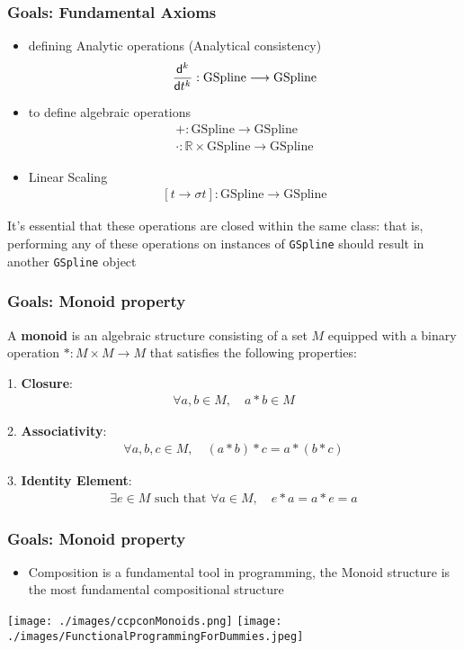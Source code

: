 \begin{frame}[t]
	\frametitle{Goals: Fundamental Axioms}
	{\fontsize{9}{5}
		\begin{itemize}
			\item defining Analytic operations (Analytical consistency)
			      \begin{equation*}
				      \frac{\mathsf{d}^{k} }{\mathsf{d} t^{k}}:\text{GSpline}\longrightarrow \text{GSpline}
			      \end{equation*}
			\item to define algebraic operations
			      \begin{eqnarray*}
				      +:\text{GSpline}\longrightarrow \text{GSpline}\\
				      \cdot:\mathbb{R} \times \text{GSpline}\longrightarrow \text{GSpline}
			      \end{eqnarray*}
			\item Linear Scaling
			      \begin{eqnarray*}
				      \left[t \rightarrow \sigma t \right]:\text{GSpline}\longrightarrow \text{GSpline}
			      \end{eqnarray*}
		\end{itemize}
		It's essential that these operations are closed within the same class: that is, performing any of these operations on instances of \Verb|GSpline| should result in another \Verb|GSpline| object
	}
\end{frame}
\begin{frame}[t]
	\frametitle{Goals: Monoid property}

	{\fontsize{10}{5}
		A \textbf{monoid} is an algebraic structure consisting of a set $M$ equipped with a binary operation
		$ \ast : M \times M \to M $ that satisfies the following properties:

		1. \textbf{Closure}:
		\begin{eqnarray*}
			\forall a, b \in M, \quad a \ast b \in M
		\end{eqnarray*}

		2. \textbf{Associativity}:
		\begin{eqnarray*}
			\forall a, b, c \in M, \quad (a \ast b) \ast c = a \ast (b \ast c)
		\end{eqnarray*}

		3. \textbf{Identity Element}:
		\begin{eqnarray*}
			\exists e \in M \text{ such that } \forall a \in M, \quad e \ast a = a \ast e = a
		\end{eqnarray*}

	}
\end{frame}
\begin{frame}[t]
	\frametitle{Goals: Monoid property}
	\begin{itemize}
		\item Composition is a fundamental tool in programming, the Monoid structure is the most fundamental compositional structure
	\end{itemize}

	\texttt{[image: ./images/ccpconMonoids.png]}
	\texttt{[image: ./images/FunctionalProgrammingForDummies.jpeg]}
\end{frame}
